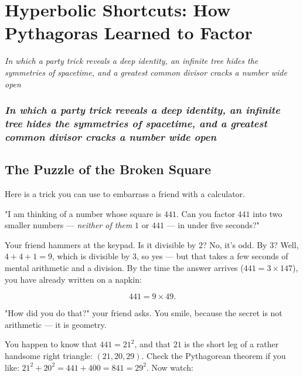 \chapter{Hyperbolic Shortcuts: How Pythagoras Learned to Factor}

\begin{center}\textit{In which a party trick reveals a deep identity, an infinite tree hides the symmetries of spacetime, and a greatest common divisor cracks a number wide open}\end{center}
\bigskip

\subsection*{\textit{In which a party trick reveals a deep identity, an infinite tree hides the symmetries of spacetime, and a greatest common divisor cracks a number wide open}}

\bigskip

\section*{The Puzzle of the Broken Square}

Here is a trick you can use to embarrass a friend with a calculator.

"I am thinking of a number whose square is $441$. Can you factor $441$ into two smaller numbers --- \textit{neither of them} $1$ or $441$ --- in under five seconds?"

Your friend hammers at the keypad. Is it divisible by $2$? No, it's odd. By $3$? Well, $4 + 4 + 1 = 9$, which is divisible by $3$, so yes --- but that takes a few seconds of mental arithmetic and a division. By the time the answer arrives ($441 = 3 \times 147$), you have already written on a napkin:

\[
441 = 9 \times 49.
\]

"How did you do that?" your friend asks. You smile, because the secret is not arithmetic --- it is geometry.

You happen to know that $441 = 21^2$, and that $21$ is the short leg of a rather handsome right triangle: $(21, 20, 29)$. Check the Pythagorean theorem if you like: $21^2 + 20^2 = 441 + 400 = 841 = 29^2$. Now watch:


